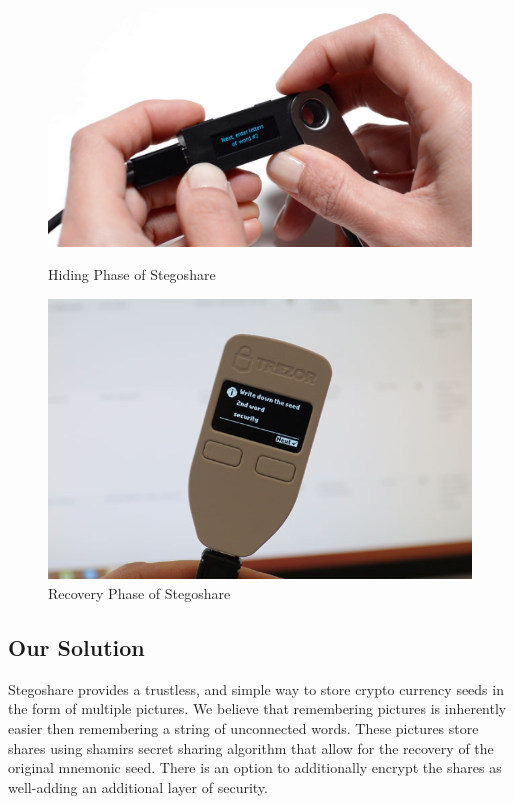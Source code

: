 \begin{figure}[H]
\centering
\begin{minipage}{.5\textwidth}
  \centering
  \includegraphics[scale = 0.15]{ledgerPhrase.jpg}
	\caption{Hiding Phase of Stegoshare}
	\label{fig: Hiding Phas}
\end{minipage}%
\begin{minipage}{.5\textwidth}
  \centering
  \includegraphics[scale = 0.25]{trezorPhrase.jpg}
	\caption{Recovery Phase of Stegoshare}
	\label{fig: Recovery Phas}
\end{minipage}
\end{figure}

\newpage
\subsection{Our Solution}
Stegoshare provides a trustless, and simple way to store crypto currency seeds in the form of multiple pictures. We believe that remembering pictures is inherently easier then remembering
a string of unconnected words. These pictures store shares using shamirs secret sharing algorithm that allow for the recovery of the original mnemonic seed. There is an option to additionally encrypt
the shares as well-adding an additional layer of security.

